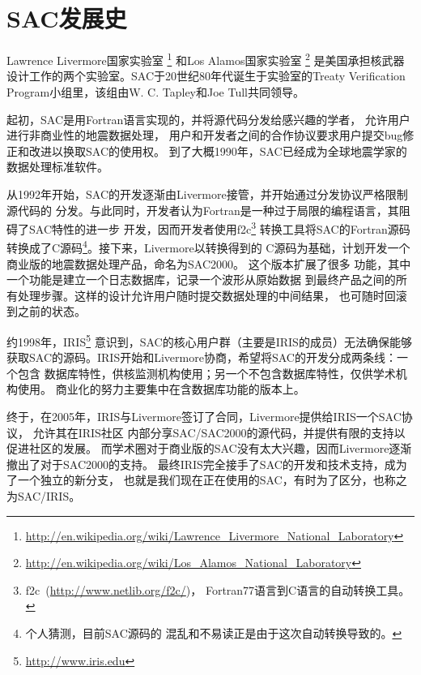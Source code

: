 \section{SAC发展史}
\label{sec:history}

Lawrence Livermore国家实验室
\footnote{\url{http://en.wikipedia.org/wiki/Lawrence\_Livermore\_National\_Laboratory}}
和Los Alamos国家实验室
\footnote{\url{http://en.wikipedia.org/wiki/Los\_Alamos\_National\_Laboratory}}
是美国承担核武器设计工作的两个实验室。SAC于20世纪80年代诞生于实验室的Treaty Verification Program小组里，该组由W. C. Tapley和Joe Tull共同领导。

起初，SAC是用Fortran语言实现的，并将源代码分发给感兴趣的学者，
允许用户进行非商业性的地震数据处理，
用户和开发者之间的合作协议要求用户提交bug修正和改进以换取SAC的使用权。
到了大概1990年，SAC已经成为全球地震学家的数据处理标准软件。

从1992年开始，SAC的开发逐渐由Livermore接管，并开始通过分发协议严格限制源代码的
分发。与此同时，开发者认为Fortran是一种过于局限的编程语言，其阻碍了SAC特性的进一步
开发，因而开发者使用f2c\footnote{f2c~(\url{http://www.netlib.org/f2c/})，
Fortran77语言到C语言的自动转换工具。}
转换工具将SAC的Fortran源码转换成了C源码\footnote{个人猜测，目前SAC源码的
混乱和不易读正是由于这次自动转换导致的。}。接下来，Livermore以转换得到的
C源码为基础，计划开发一个商业版的地震数据处理产品，命名为SAC2000。
这个版本扩展了很多
功能，其中一个功能是建立一个日志数据库，记录一个波形从原始数据
到最终产品之间的所有处理步骤。这样的设计允许用户随时提交数据处理的中间结果，
也可随时回滚到之前的状态。

约1998年，IRIS\footnote{\url{http://www.iris.edu}}
意识到，SAC的核心用户群（主要是IRIS的成员）无法确保能够
获取SAC的源码。IRIS开始和Livermore协商，希望将SAC的开发分成两条线：一个包含
数据库特性，供核监测机构使用；另一个不包含数据库特性，仅供学术机构使用。
商业化的努力主要集中在含数据库功能的版本上。

终于，在2005年，IRIS与Livermore签订了合同，Livermore提供给IRIS一个SAC协议，
允许其在IRIS社区
内部分享SAC/SAC2000的源代码，并提供有限的支持以促进社区的发展。
而学术圈对于商业版的SAC没有太大兴趣，因而Livermore逐渐撤出了对于SAC2000的支持。
最终IRIS完全接手了SAC的开发和技术支持，成为了一个独立的新分支，
也就是我们现在正在使用的SAC，有时为了区分，也称之为SAC/IRIS。
